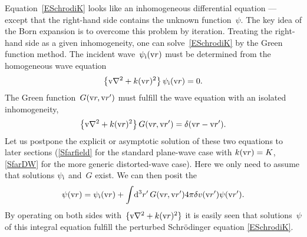 Equation~\cref{ESchrodiK} looks
like an inhomogeneous differential equation ---
except that the right-hand side contains the unknown function~$\psi$.
The key idea of the Born expansion is to overcome this problem by iteration.
Treating the right-hand side as a given inhomogeneity,
one can solve~\cref{ESchrodiK} by the Green function method.
The incident wave~$\psi_{\text{i}}(\text{v}{r})$ must be determined from the homogeneous wave equation
\begin{equation}\label{EHomoK}
  \left\{\text{v}{\nabla}^2+k(\text{v}{r})^2\right\}\psi_{\text{i}}(\text{v}{r}) = 0.
\end{equation}
The Green function~$G(\text{v}{r},\text{v}{r}')$ must fulfill the wave equation with an isolated inhomogeneity,
%
\begin{equation}\label{EGreenK}
  \left\{\text{v}{\nabla}^2+k(\text{v}{r})^2\right\}G(\text{v}{r},\text{v}{r}') = \delta(\text{v}{r}-\text{v}{r}').
\end{equation}
%
Let us postpone the explicit or asymptotic solution of these two equations
to later sections (\cref{Sfarfield} for the standard plane-wave case with $k(\text{v}{r})=K$,
\cref{SfarDW} for the more generic distorted-wave case).
Here we only need to assume that solutions $\psi_{\text{i}}$ and~$G$ exist.
We can then posit the 
%
\begin{equation}\label{EPsiFormal}
  \psi(\text{v}{r})
  = \psi_{\text{i}}(\text{v}{r})
  + \int\!\mathrm d^3r'\, G(\text{v}{r},\text{v}{r}') 4\pi\delta v(\text{v}{r}')\psi(\text{v}{r}').
\end{equation}
By operating on both sides with~$\{\text{v}{\nabla}^2+k(\text{v}{r})^2\}$
it is easily seen that solutions~$\psi$ of this integral equation
fulfill the perturbed Schrödinger equation \cref{ESchrodiK}.

